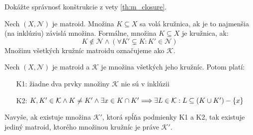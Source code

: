 \begin{exercise}
\label{ex:m_closure}
Dokážte správnosť konštrukcie z vety \ref{th:m_closure}.
\end{exercise}

\begin{definition}
Nech $(X, \mathcal{N})$ je matroid. Množina $K \subseteq X$ sa volá kružnica, ak je to najmenšia (na inklúziu) závislá množina. Formálne,
množina $K \subseteq X$ je kružnica, ak:
$$ K \not\in\mathcal{N} \wedge \left(\forall K' \subsetneq K: K' \in\mathcal{N} \right)$$ 
\noindent
Množinu všetkých kružníc matroidu označujeme ako $\mathcal{K}$.
\end{definition}

\begin{theorem}
\label{th:m_cycles}
Nech $(X, \mathcal{N})$ je matroid a $\mathcal{K}$ je množina všetkých jeho kružníc. Potom platí:
\begin{enumerate}
    \item[K1:] žiadne dva prvky množiny $\mathcal{K}$ nie sú v inklúzii
    \item[K2:] $K, K' \in \mathcal{K} \wedge K \neq K' \wedge \exists x \in K \cap K' \Longrightarrow \exists L \in \mathcal{K}: L \subseteq (K \cup K') - \left\{x\right\}$
\end{enumerate}

Navyše, ak existuje množina $\mathcal{K}'$, ktorá spĺňa podmienky K1 a K2, tak existuje jediný matroid, ktorého množinou kružníc je práve $\mathcal{K}'$.
\end{theorem}
